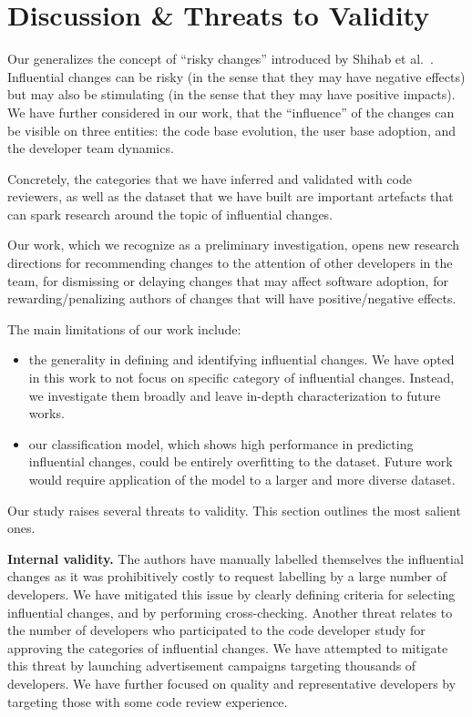 \section{Discussion \& Threats to Validity}
\label{sec:discussion}

Our generalizes the concept of ``risky changes'' introduced by Shihab et al.~\cite{shihab_industrial_2012}.
Influential changes can be risky (in the sense that they may have negative effects) but may also be stimulating (in the sense that
they may have positive impacts). We have further considered in our work, that the ``influence'' of the changes can be
visible on three entities: the code base evolution, the user base adoption, and the developer team dynamics.

Concretely, the categories that we have inferred and validated with code reviewers, as well as the dataset that
we have built are important artefacts that can spark research around the topic of influential changes.

Our work, which we recognize as a preliminary investigation, opens new research directions for
recommending changes to the attention of other developers in the team, for dismissing or delaying changes that may
affect software adoption, for rewarding/penalizing authors of changes that will have positive/negative effects.

The main limitations of our work include:
\begin{itemize}
	\item the generality in defining and identifying influential changes. We have opted in this work to not focus on specific category of influential changes. Instead, we investigate them broadly and leave in-depth characterization to future works.
	\item our classification model, which shows high performance in predicting influential changes, could be entirely overfitting to  the dataset. Future work would require application of the model to a larger and more diverse dataset.
\end{itemize}

Our study raises several threats to validity. This section outlines the most salient ones.

\textbf{Internal validity.} The authors have manually labelled themselves the influential changes as it
was prohibitively costly to request labelling by a large number of developers. We have mitigated this issue
by clearly defining criteria for selecting influential changes, and by performing cross-checking.
Another threat relates to the number of developers who participated to the code developer study for
approving the categories of influential changes. We have attempted to mitigate this threat by launching
advertisement campaigns targeting thousands of developers. We have further focused on quality and representative 
developers by targeting those with some code review experience.

